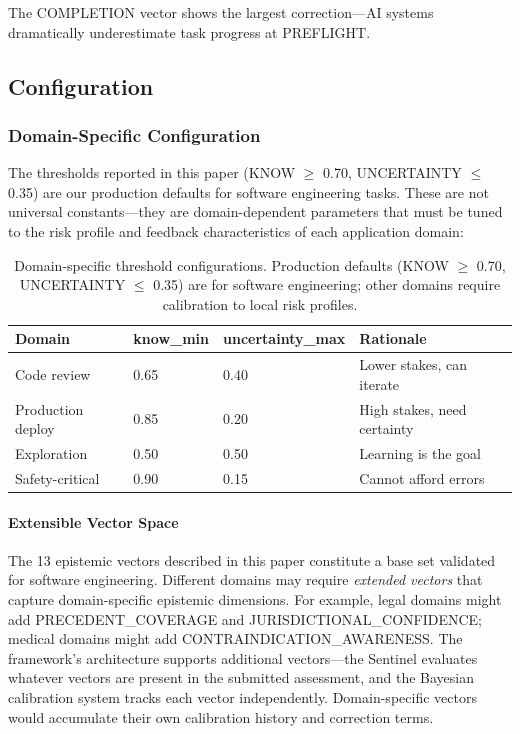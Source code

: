 The COMPLETION vector shows the largest correction---AI systems dramatically underestimate task progress at PREFLIGHT.

\subsection{Configuration}

\subsubsection{Domain-Specific Configuration}

The thresholds reported in this paper (KNOW $\geq$ 0.70, UNCERTAINTY $\leq$ 0.35) are our production defaults for software engineering tasks. These are not universal constants---they are domain-dependent parameters that must be tuned to the risk profile and feedback characteristics of each application domain:

\begin{table}[h]
\centering
\begin{tabular}{llll}
\toprule
\textbf{Domain} & \textbf{know\_min} & \textbf{uncertainty\_max} & \textbf{Rationale} \\
\midrule
Code review & 0.65 & 0.40 & Lower stakes, can iterate \\
Production deploy & 0.85 & 0.20 & High stakes, need certainty \\
Exploration & 0.50 & 0.50 & Learning is the goal \\
Safety-critical & 0.90 & 0.15 & Cannot afford errors \\
\bottomrule
\end{tabular}
\caption{Domain-specific threshold configurations. Production defaults (KNOW $\geq$ 0.70, UNCERTAINTY $\leq$ 0.35) are for software engineering; other domains require calibration to local risk profiles.}
\label{tab:domain-thresholds}
\end{table}

\paragraph{Extensible Vector Space}

The 13 epistemic vectors described in this paper constitute a base set validated for software engineering. Different domains may require \emph{extended vectors} that capture domain-specific epistemic dimensions. For example, legal domains might add PRECEDENT\_COVERAGE and JURISDICTIONAL\_CONFIDENCE; medical domains might add CONTRAINDICATION\_AWARENESS. The framework's architecture supports additional vectors---the Sentinel evaluates whatever vectors are present in the submitted assessment, and the Bayesian calibration system tracks each vector independently. Domain-specific vectors would accumulate their own calibration history and correction terms.

